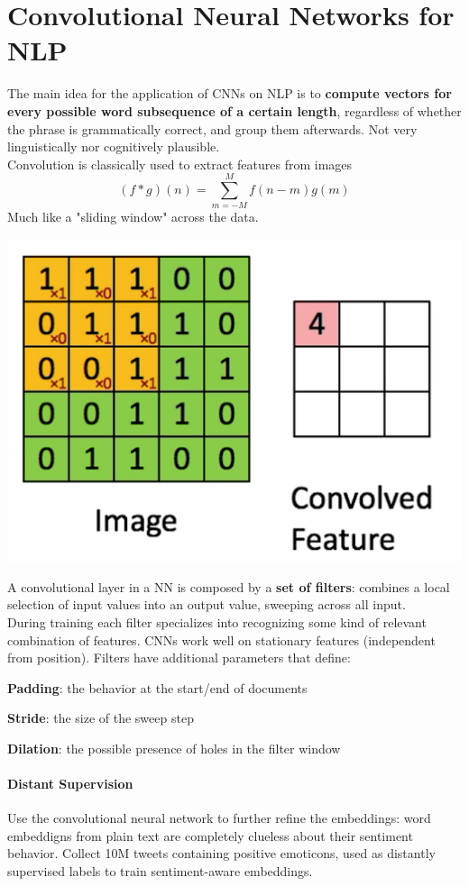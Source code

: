\documentclass[10pt]{report}
\begin{document}
\section{Convolutional Neural Networks for NLP}
The main idea for the application of CNNs on NLP is to \textbf{compute vectors for every possible word subsequence of a certain length}, regardless of whether the phrase is grammatically correct, and group them afterwards. Not very linguistically nor cognitively plausible.\\
Convolution is classically used to extract features from images
$$(f * g)(n) = \sum_{m=-M}^M f(n-m)g(m)$$
Much like a "sliding window" across the data.
\begin{center}
	\includegraphics[scale=0.5]{23.png}
\end{center}
A convolutional layer in a NN is composed by a \textbf{set of filters}: combines a local selection of input values into an output value, sweeping across all input.\\
During training each filter specializes into recognizing some kind of relevant combination of features. CNNs work well on stationary features (independent from position). Filters have additional parameters that define:\begin{list}{}{}
	\item \textbf{Padding}: the behavior at the start/end of documents
	\item \textbf{Stride}: the size of the sweep step
	\item \textbf{Dilation}: the possible presence of holes in the filter window
\end{list}
\paragraph{Distant Supervision} Use the convolutional neural network to further refine the embeddings: word embeddigns from plain text are completely clueless about their sentiment behavior. Collect 10M tweets containing positive emoticons, used as distantly supervised labels to train sentiment-aware embeddings.
\end{document}

